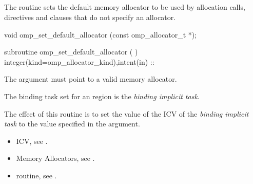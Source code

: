 \subsection{}
\label{subsec:omp_set_default_allocator}

\summary
The  routine sets the default memory allocator to be used by allocation calls,  directives and  clauses that do not specify an allocator.

\format
\begin{ccppspecific}
\begin{ompcFunction}
void omp_set_default_allocator (const omp_allocator_t *);
\end{ompcFunction}
\end{ccppspecific}
\begin{fortranspecific}
\begin{ompfSubroutine}
subroutine omp_set_default_allocator (  )
integer(kind=omp_allocator_kind),intent(in) :: 
\end{ompfSubroutine}
\end{fortranspecific}

\constraints

The  argument must point to a valid memory allocator.

\binding
The binding task set for an  region is the \emph{binding implicit task}.

\effect

The effect of this routine is to set the value of the  ICV of the \emph{binding implicit task} to the value specified in the  argument.

\crossreferences

\begin{itemize}
\item {} ICV, see .
\item Memory Allocators, see .
\item {} routine, see .
\end{itemize}

\subsection{}
\label{subsec:omp_get_default_allocator}

